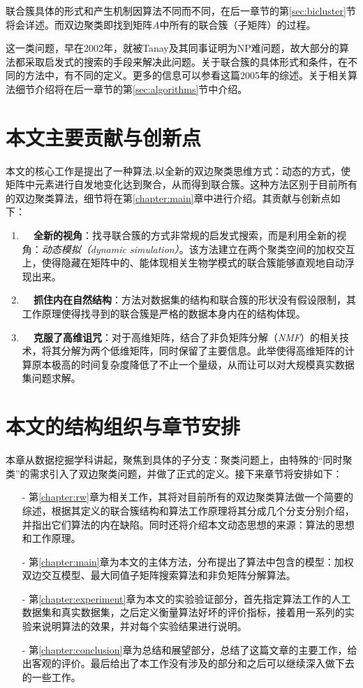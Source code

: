 联合簇具体的形式和产生机制因算法不同而不同，在后一章节的第\ref{sec:bicluster}节将会详述。而双边聚类即找到矩阵$A$中所有的联合簇（子矩阵）的过程。


这一类问题，早在2002年，就被Tanay及其同事\cite{tanay2002discovering}证明为NP难问题，故大部分的算法都采取启发式的搜索的手段来解决此问题。关于联合簇的具体形式和条件，在不同的方法中，有不同的定义。更多的信息可以参看这篇2005年的综述\cite{tanay2005biclustering}。关于相关算法细节介绍将在后一章节的第\ref{sec:algorithms}节中介绍。

\section{本文主要贡献与创新点}
本文的核心工作是提出了一种算法\CoSync{},以全新的双边聚类思维方式：动态的方式，使矩阵中元素进行自发地变化达到聚合，从而得到联合簇。这种方法区别于目前所有的双边聚类算法，细节将在第\ref{chapter:main}章中进行介绍。其贡献与创新点如下：
\begin{enumerate}
  \item \textbf{~~全新的视角}：\CoSync{}找寻联合簇的方式非常规的启发式搜索，而是利用全新的视角：\emph{动态模拟（dynamic simulation）}。该方法建立在两个聚类空间的加权交互上，使得隐藏在矩阵中的、能体现相关生物学模式的联合簇能够直观地自动浮现出来。
  \item \textbf{~~抓住内在自然结构}：\CoSync{}方法对数据集的结构和联合簇的形状没有假设限制，其工作原理使得找寻到的联合簇是严格的数据本身内在的结构体现。
  \item \textbf{~~克服了高维诅咒}：对于高维矩阵，\CoSync{}结合了非负矩阵分解（\emph{NMF}）的相关技术，将其分解为两个低维矩阵，同时保留了主要信息。此举使得高维矩阵的计算原本极高的时间复杂度降低了不止一个量级，从而让\CoSync{}可以对大规模真实数据集问题求解。
\end{enumerate}

\section{本文的结构组织与章节安排}
本章从数据挖掘学科讲起，聚焦到具体的子分支：聚类问题上，由特殊的“同时聚类”的需求引入了双边聚类问题，并做了正式的定义。接下来章节将安排如下：

\begin{itemize}
  \item[-] 第\ref{chapter:rw}章为相关工作，其将对目前所有的双边聚类算法做一个简要的综述，根据其定义的联合簇结构和算法工作原理将其分成几个分支分别介绍，并指出它们算法的内在缺陷。同时还将介绍本文动态思想的来源：\Sync{}算法的思想和工作原理。
  \item[-] 第\ref{chapter:main}章为本文的主体方法，分布提出了\CoSync{}算法中包含的模型：加权双边交互模型、最大同值子矩阵搜索算法和非负矩阵分解算法。
  \item[-] 第\ref{chapter:experiment}章为本文的实验验证部分，首先指定算法工作的人工数据集和真实数据集，之后定义衡量算法好坏的评价指标，接着用一系列的实验来说明\CoSync{}算法的效果，并对每个实验结果进行说明。
  \item[-] 第\ref{chapter:conclusion}章为总结和展望部分，总结了这篇文章的主要工作，给出客观的评价。最后给出了本工作没有涉及的部分和之后可以继续深入做下去的一些工作。


\end{itemize}

